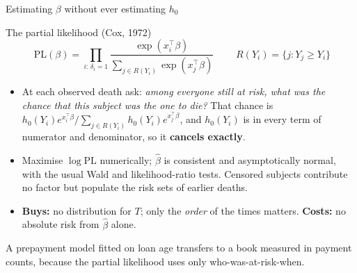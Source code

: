 \documentclass[aspectratio=169,11pt]{beamer}
\begin{document}
\begin{frame}{Estimating $\beta$ without ever estimating $h_0$}
  \scriptsize
  \begin{block}{The partial likelihood (Cox, 1972)}
    \[
      \boxed{\;
        \mathrm{PL}(\beta)=\prod_{i:\,\delta_i=1}
        \frac{\exp(x_i^{\top}\beta)}
             {\sum_{j\in R(Y_i)}\exp(x_j^{\top}\beta)}\;}
      \qquad R(Y_i)=\{j: Y_j\ge Y_i\}
    \]
  \end{block}
  \begin{readme}
    \begin{itemize}
      \item At each observed death ask: \emph{among everyone still at risk, what was the
            chance that this subject was the one to die?} That chance is
            $h_0(Y_i)e^{x_i^\top\beta}\big/\sum_{j\in R(Y_i)}h_0(Y_i)e^{x_j^\top\beta}$,
            and $h_0(Y_i)$ is in every term of numerator and denominator, so it
            \textbf{cancels exactly}.
      \item Maximise $\log \mathrm{PL}$ numerically; $\hat\beta$ is consistent and
            asymptotically normal, with the usual Wald and likelihood-ratio tests. Censored
            subjects contribute no factor but populate the risk sets of earlier deaths.
      \item \textbf{Buys:} no distribution for $T$; only the \emph{order} of the times
            matters. \textbf{Costs:} no absolute risk from $\hat\beta$ alone.
    \end{itemize}
  \end{readme}
  \begin{industry}
    A prepayment model fitted on loan age transfers to a book measured in payment counts,
    because the partial likelihood uses only who-was-at-risk-when.
  \end{industry}
\end{frame}
\end{document}
